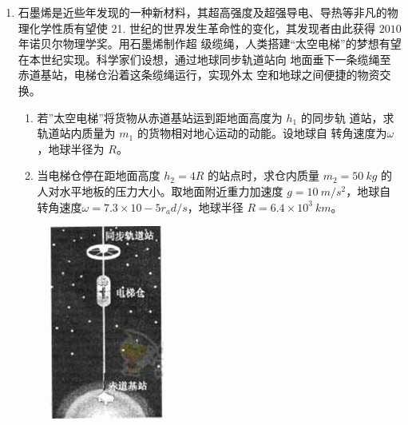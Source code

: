 \begin{enumerate}
{\begin{enumerate}
\end{enumerate}


}


\newpage
\item 
{}
石墨烯是近些年发现的一种新材料，其超高强度及超强导电、导热等非凡的物理化学性质有望使
21. 世纪的世界发生革命性的变化，其发现者由此获得 $ 2010 $ 年诺贝尔物理学奖。用石墨烯制作超
级缆绳，人类搭建“太空电梯”的梦想有望在本世纪实现。科学家们设想，通过地球同步轨道站向
地面垂下一条缆绳至赤道基站，电梯仓沿着这条缆绳运行，实现外太
空和地球之间便捷的物资交换。
\begin{enumerate}
\renewcommand{\labelenumi}{\arabic{enumi}.}
\item
若”太空电梯”将货物从赤道基站运到距地面高度为 $ h_{1} $ 的同步轨
道站，求轨道站内质量为 $ m_{1} $ 的货物相对地心运动的动能。设地球自
转角速度为$ \omega $，地球半径为 $ R $。
\item 
当电梯仓停在距地面高度 $ h_{2} =4R $ 的站点时，求仓内质量 $ m_{2} = 50 \ kg $ 的人对水平地板的压力大小。取地面附近重力加速度 $ g= 10 \ m/s^{2} $，地球自转角速度$ \omega =7.3 \times 10-5r_{a}d/s $，地球半径 $ R= 6.4 \times 10^{3} \ km $。




\end{enumerate}
\begin{figure}[h!]
\flushright 
\includegraphics[width=0.15\linewidth]{picture/screenshot029}
\end{figure}


\end{enumerate}
